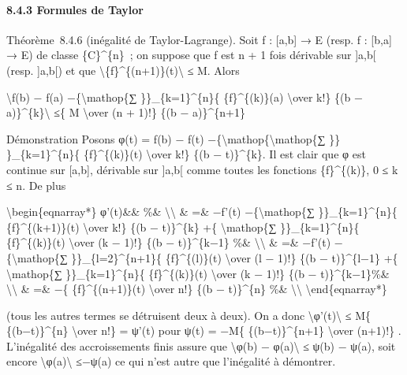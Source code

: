 \documentclass[]{article}
\begin{document}
\paragraph{8.4.3 Formules de Taylor}

Théorème~8.4.6 (inégalité de Taylor-Lagrange). Soit f : {[}a,b{]} → E
(resp. f : {[}b,a{]} → E) de classe \{C\}\^{}\{n\}~; on suppose que f
est n + 1 fois dérivable sur {]}a,b{[} (resp. {]}a,b{[}) et que
\textbackslash{}\textbar{}\{f\}\^{}\{(n+1)\}(t)\textbackslash{}\textbar{}
≤ M. Alors

\textbackslash{}\textbar{}f(b) − f(a) −\{\textbackslash{}mathop\{∑
\}\}\_\{k=1\}\^{}\{n\}\{ \{f\}\^{}\{(k)\}(a) \textbackslash{}over k!\}
\{(b − a)\}\^{}\{k\}\textbackslash{}\textbar{} ≤\{ M
\textbackslash{}over (n + 1)!\} \{(b − a)\}\^{}\{n+1\}

Démonstration Posons φ(t) = f(b) − f(t)
−\{\textbackslash{}mathop\{\textbackslash{}mathop\{∑ \}\}
\}\_\{k=1\}\^{}\{n\}\{ \{f\}\^{}\{(k)\}(t) \textbackslash{}over k!\}
\{(b − t)\}\^{}\{k\}. Il est clair que φ est continue sur {[}a,b{]},
dérivable sur {]}a,b{[} comme toutes les fonctions \{f\}\^{}\{(k)\}, 0 ≤
k ≤ n. De plus

\textbackslash{}begin\{eqnarray*\} φ'(t)\&\& \%\&
\textbackslash{}\textbackslash{} \& =\& −f'(t)
−\{\textbackslash{}mathop\{∑ \}\}\_\{k=1\}\^{}\{n\}\{
\{f\}\^{}\{(k+1)\}(t) \textbackslash{}over k!\} \{(b − t)\}\^{}\{k\} +\{
\textbackslash{}mathop\{∑ \}\}\_\{k=1\}\^{}\{n\}\{ \{f\}\^{}\{(k)\}(t)
\textbackslash{}over (k − 1)!\} \{(b − t)\}\^{}\{k−1\} \%\&
\textbackslash{}\textbackslash{} \& =\& −f'(t)
−\{\textbackslash{}mathop\{∑ \}\}\_\{l=2\}\^{}\{n+1\}\{
\{f\}\^{}\{(l)\}(t) \textbackslash{}over (l − 1)!\} \{(b −
t)\}\^{}\{l−1\} +\{ \textbackslash{}mathop\{∑ \}\}\_\{k=1\}\^{}\{n\}\{
\{f\}\^{}\{(k)\}(t) \textbackslash{}over (k − 1)!\} \{(b −
t)\}\^{}\{k−1\}\%\& \textbackslash{}\textbackslash{} \& =\& −\{
\{f\}\^{}\{(n+1)\}(t) \textbackslash{}over n!\} \{(b − t)\}\^{}\{n\}
\%\& \textbackslash{}\textbackslash{} \textbackslash{}end\{eqnarray*\}

(tous les autres termes se détruisent deux à deux). On a donc
\textbackslash{}\textbar{}φ'(t)\textbackslash{}\textbar{} ≤ M\{
\{(b−t)\}\^{}\{n\} \textbackslash{}over n!\} = ψ'(t) pour ψ(t) = −M\{
\{(b−t)\}\^{}\{n+1\} \textbackslash{}over (n+1)!\} . L'inégalité des
accroissements finis assure que \textbackslash{}\textbar{}φ(b) −
φ(a)\textbackslash{}\textbar{} ≤ ψ(b) − ψ(a), soit encore
\textbackslash{}\textbar{}φ(a)\textbackslash{}\textbar{} ≤−ψ(a) ce qui
n'est autre que l'inégalité à démontrer.
\end{document}
